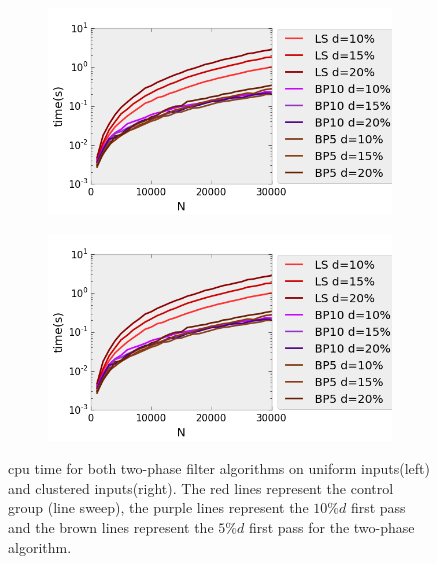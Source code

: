 \begin{figure}[H] 
  \begin{subfigure}[b]{0.5\linewidth}
    \centering
    \includegraphics[width=0.9\linewidth]{Pictures/unif_ls_bp_t} 
    \label{fig:unif_ls_bp_t} 
    \vspace{4ex}
  \end{subfigure}%
  \begin{subfigure}[b]{0.5\linewidth}
    \centering
    \includegraphics[width=0.9\linewidth]{Pictures/unif_ls_bp_t} 
    \label{fig:clus_ls_bp_t} 
    \vspace{4ex}
  \end{subfigure}
  \caption{cpu time for both two-phase filter algorithms on uniform inputs(left) and clustered inputs(right).  The red lines represent the control group (line sweep), the purple lines represent the $10\%d$ first pass and the brown lines represent the $5\%d$ first pass for the two-phase algorithm.}
  \label{fig:ls_bp_t} 
\end{figure}

